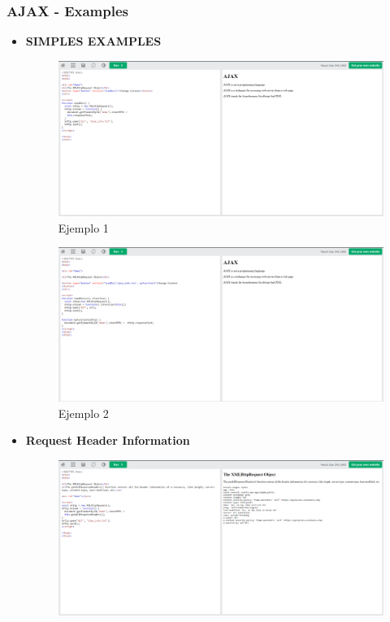 \documentclass{article}
\begin{document}
	\subsubsection{AJAX - Examples}
	\begin{itemize}
		\item \textbf{SIMPLES EXAMPLES}
		\begin{figure}[H]
			\centering
			\includegraphics[width=1\textwidth,keepaspectratio]{img/ejemplo22.png}
			\caption{Ejemplo 1}
		\end{figure}
		\begin{figure}[H]
			\centering
			\includegraphics[width=1\textwidth,keepaspectratio]{img/ejemplo23.png}
			\caption{Ejemplo 2}
		\end{figure}
		\newpage
		\item \textbf{Request Header Information}
		\begin{figure}[H]
			\centering
			\includegraphics[width=1\textwidth,keepaspectratio]{img/ejemplo24.png}

\end{figure}
\end{itemize}
\end{document}
